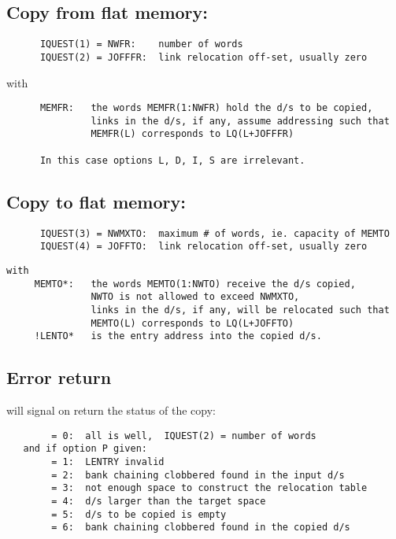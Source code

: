 \subsection*{Copy from flat memory:}

\begin{verbatim}
      IQUEST(1) = NWFR:    number of words
      IQUEST(2) = JOFFFR:  link relocation off-set, usually zero
\end{verbatim} 


with
\begin{verbatim}
      MEMFR:   the words MEMFR(1:NWFR) hold the d/s to be copied,
               links in the d/s, if any, assume addressing such that
               MEMFR(L) corresponds to LQ(L+JOFFFR)

      In this case options L, D, I, S are irrelevant.
\end{verbatim} 

\subsection*{Copy to flat memory:}

\begin{verbatim}
      IQUEST(3) = NWMXTO:  maximum # of words, ie. capacity of MEMTO
      IQUEST(4) = JOFFTO:  link relocation off-set, usually zero
\end{verbatim} 


\begin{verbatim}
with
     MEMTO*:   the words MEMTO(1:NWTO) receive the d/s copied,
               NWTO is not allowed to exceed NWMXTO,
               links in the d/s, if any, will be relocated such that
               MEMTO(L) corresponds to LQ(L+JOFFTO)
     !LENTO*   is the entry address into the copied d/s.
\end{verbatim} 

\subsection*{Error return}

 will signal on return the status of the copy:
\begin{verbatim}
        = 0:  all is well,  IQUEST(2) = number of words
   and if option P given:
        = 1:  LENTRY invalid
        = 2:  bank chaining clobbered found in the input d/s
        = 3:  not enough space to construct the relocation table
        = 4:  d/s larger than the target space
        = 5:  d/s to be copied is empty
        = 6:  bank chaining clobbered found in the copied d/s
\end{verbatim} 

